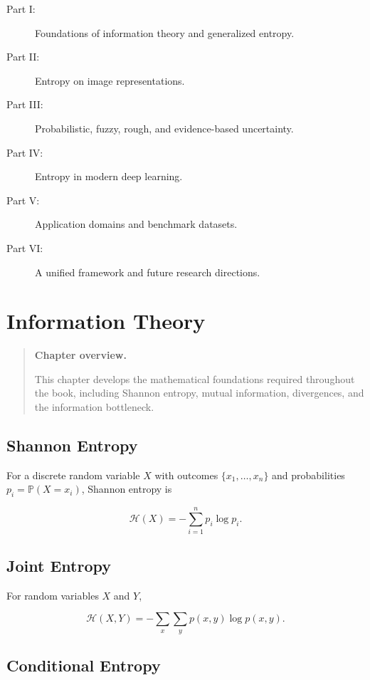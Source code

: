 \documentclass[11pt,oneside]{book}
\theoremstyle{remark}
\newcommand{\Entropy}{\mathcal{H}}
\newcommand{\Prob}{\mathbb{P}}
\newenvironment{chapteroverview}
{
	\begin{quote}
		\small
		\textbf{Chapter overview.}
	}
	{
	\end{quote}
}
\begin{document}
	\begin{description}
		\item[Part I:] Foundations of information theory and generalized entropy.
		\item[Part II:] Entropy on image representations.
		\item[Part III:] Probabilistic, fuzzy, rough, and evidence-based uncertainty.
		\item[Part IV:] Entropy in modern deep learning.
		\item[Part V:] Application domains and benchmark datasets.
		\item[Part VI:] A unified framework and future research directions.
	\end{description}
	
	
	\chapter{Information Theory}
	\label{chap:information-theory}
	
	\begin{chapteroverview}
		This chapter develops the mathematical foundations required throughout the
		book, including Shannon entropy, mutual information, divergences, and the
		information bottleneck.
	\end{chapteroverview}
	
	\section{Shannon Entropy}
	
	For a discrete random variable \(X\) with outcomes
	\(\{x_1,\ldots,x_n\}\) and probabilities \(p_i=\Prob(X=x_i)\),
	Shannon entropy is
	
	\[
	\Entropy(X)
	=
	-\sum_{i=1}^{n} p_i \log p_i.
	\]
	
	\section{Joint Entropy}
	
	For random variables \(X\) and \(Y\),
	
	\[
	\Entropy(X,Y)
	=
	-\sum_{x}\sum_{y}
	p(x,y)\log p(x,y).
	\]
	
	\section{Conditional Entropy}
	
\end{document}
